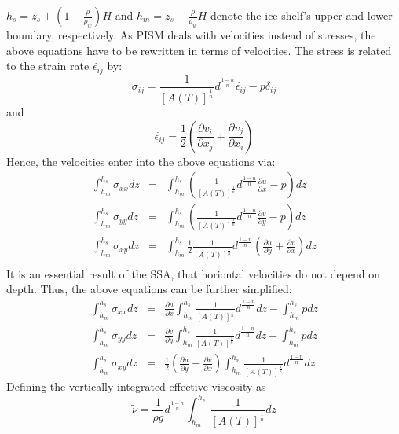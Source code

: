 \documentclass[a4paper,10pt]{article}
\begin{document}
$h_s=z_s+(1-\frac{\rho}{\rho_w})H$ and
$h_m=z_s-\frac{\rho}{\rho_w}H$ denote the ice shelf's upper and lower boundary,
respectively. As PISM deals with velocities instead of stresses, the above equations have to be rewritten in terms of velocities. The stress is related to the strain rate $\dot{\epsilon_{ij}}$ by:
\begin{equation*}
\sigma_{ij}=\frac{1}{\left[A(T)\right]^{\frac{1}{n}}}d^{\frac{1-n}{n}} \dot{\epsilon_{ij}} - p\delta_{ij}
\end{equation*}
and
\begin{equation*}
\dot{\epsilon_{ij}}=\frac{1}{2}\left(\frac{\partial v_i}{\partial x_j}+\frac{\partial v_j}{\partial x_i}  \right)
\end{equation*}
Hence, the velocities enter into the above equations via:
\begin{eqnarray*}
\int_{h_m}^{h_s}\sigma_{xx}dz & = & \int_{h_m}^{h_s}\left(\frac{1}{\left[A(T)\right]^{\frac{1}{n}}}d^{\frac{1-n}{n}}\frac{\partial u}{\partial x}-p \right) dz\\
\int_{h_m}^{h_s}\sigma_{yy}dz & = & \int_{h_m}^{h_s}\left(\frac{1}{\left[A(T)\right]^{\frac{1}{n}}}d^{\frac{1-n}{n}}\frac{\partial v}{\partial y}-p \right) dz\\
\int_{h_m}^{h_s}\sigma_{xy}dz & = &  \int_{h_m}^{h_s}\frac{1}{2}\frac{1}{\left[A(T)\right]^{\frac{1}{n}}}d^{\frac{1-n}{n}}\left(\frac{\partial u}{\partial y}+\frac{\partial v}{\partial x} \right)dz  \\
\end{eqnarray*}
It is an essential result of the SSA, that horiontal velocities do not depend on depth. Thus, the above equations can be further simplified:
\begin{eqnarray*}
\int_{h_m}^{h_s}\sigma_{xx}dz & = & \frac{\partial u}{\partial x} \int_{h_m}^{h_s}\frac{1}{\left[A(T)\right]^{\frac{1}{n}}}d^{\frac{1-n}{n}}dz-\int_{h_m}^{h_s}p dz \\
\int_{h_m}^{h_s}\sigma_{yy}dz & = & \frac{\partial v}{\partial y} \int_{h_m}^{h_s}\frac{1}{\left[A(T)\right]^{\frac{1}{n}}}d^{\frac{1-n}{n}}dz-\int_{h_m}^{h_s}p dz \\
\int_{h_m}^{h_s}\sigma_{xy}dz & = & \frac{1}{2}\left(\frac{\partial u}{\partial y}+\frac{\partial v}{\partial x} \right)\int_{h_m}^{h_s}\frac{1}{\left[A(T)\right]^{\frac{1}{n}}}d^{\frac{1-n}{n}}dz
\end{eqnarray*}
Defining the vertically integrated effective viscosity as
\begin{equation}%
\tilde{\nu}=\frac{1}{\rho g}d^{\frac{1-n}{n}}\int_{h_m}^{h_s}\frac{1}{\left[A(T)\right]^{\frac{1}{n}}}dz
\label{myNu}
\end{equation} 
\end{document}
